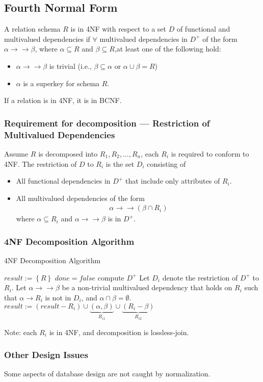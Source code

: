 \subsection{Fourth Normal Form}
\begin{definition}
    A relation schema $R$ is in 4NF with respect to a set $D$ of functional and multivalued dependencies if $\forall$ multivalued dependencies in $D^+$ of the form $\alpha\rightarrow\rightarrow\beta$, where $\alpha\subseteq R$ and $\beta\subseteq R$,at least one of the following hold:
    \begin{itemize}\small
        \item $\alpha\rightarrow\rightarrow\beta$ is trivial (i.e., $\beta\subseteq\alpha$ or $\alpha\cup \beta=R$)
        \item $\alpha$ is a superkey for schema $R$. 
    \end{itemize}
\end{definition}
If a relation is in 4NF, it is in BCNF.

\subsubsection{Requirement for decomposition --- Restriction of Multivalued Dependencies}
Assume $R$ is decomposed into $R_1, R_2, \dots, R_n$, each $R_i$ is required to conform to 4NF. The restriction of $D$ to $R_i$ is the set $D_i$ consisting of 
\begin{itemize}\small
    \item All functional dependencies in $D^+$ that include only attributes of $R_i$. 
    \item All multivalued dependencies of the form
    \begin{align*}
        \alpha \rightarrow \rightarrow (\beta\cap R_i)
    \end{align*}
    where $\alpha\subseteq R_i$ and $\alpha \rightarrow\rightarrow\beta$ is in $D^+$. 
\end{itemize}

\subsubsection{4NF Decomposition Algorithm}
\begin{algorithm}[H]
    \caption{4NF Decomposition Algorithm}
    \begin{algorithmic}
        \State $result:=\left\{R\right\}$
        \State $done=false$
        \State compute $D^+$
        \State Let $D_i$ denote the restriction of $D^+$ to $R_i$. 
                \State Let $\alpha\rightarrow\rightarrow \beta$ be a non-trivial multivalued dependency that holds on $R_i$ such that $\alpha\rightarrow R_i$ is not in $D_i$, and $\alpha \cap \beta =\emptyset$. 
                \State $result:=(result-R_i)\cup\underbrace{(\alpha, \beta)}_{R_{i1}}\cup\underbrace{(R_i-\beta)}_{R_{i2}}$
            \EndIf
        \EndWhile
    \end{algorithmic}
\end{algorithm}
Note: each $R_i$ is in 4NF, and decomposition is lossless-join.

\subsubsection{Other Design Issues}
Some aspects of database design are not caught by normalization.
